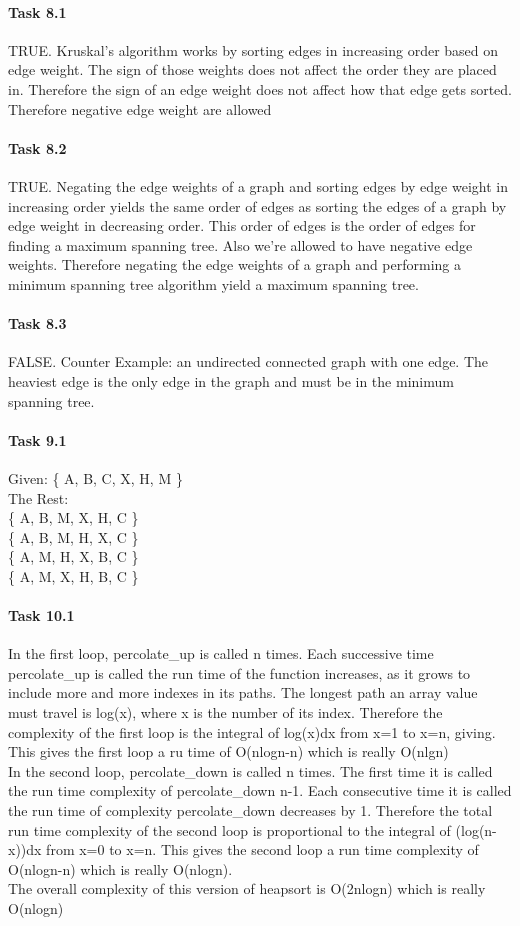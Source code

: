 \documentclass[11pt]{article}
\begin{document}
\paragraph{Task 8.1}
TRUE. Kruskal's algorithm works by sorting edges in increasing order based on edge weight. The sign of those weights does not affect the order they are placed in. Therefore the sign of an edge weight does not affect how that edge gets sorted. Therefore negative edge weight are allowed
\paragraph{Task 8.2}
TRUE. Negating the edge weights of a graph and sorting edges by edge weight in increasing order yields the same order of edges as sorting the edges of a graph by edge weight in decreasing order. This order of edges is the order of edges for finding a maximum spanning tree. Also we're allowed to have negative edge weights. Therefore negating the edge weights of a graph and performing a minimum spanning tree algorithm yield a maximum spanning tree.

\paragraph{Task 8.3}
FALSE. Counter Example: an undirected connected graph with one edge. The heaviest edge is the only edge in the graph and must be in the minimum spanning tree.

\paragraph{Task 9.1} Given: \{ A, B, C, X, H, M \}
\\The Rest:
\\\{ A, B, M, X, H, C \}
\\\{ A, B, M, H, X, C \}
\\\{ A, M, H, X, B, C \}
\\\{ A, M, X, H, B, C \}

\paragraph{Task 10.1}
In the first loop, percolate\_up is called n times. Each successive time percolate\_up is called the run time of the function increases, as it grows to include more and more indexes in its paths. The longest path an array value must travel is log(x), where x is the number of its index. Therefore the complexity of the first loop is the integral of log(x)dx from x=1 to x=n, giving. This gives the first loop a ru time of O(nlogn-n) which is really O(nlgn) 
\\In the second loop, percolate\_down is called n times. The first time it is called the run time complexity of percolate\_down n-1. Each consecutive time it is called the run time of complexity percolate\_down decreases by 1. Therefore the total run time complexity of the second loop is proportional to the integral of (log(n-x))dx from x=0 to x=n. This gives the second loop a run time complexity of O(nlogn-n) which is really O(nlogn).
\\The overall complexity of this version of heapsort is O(2nlogn) which is really O(nlogn)
\end{document}
